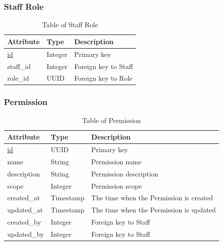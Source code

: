 \subsubsection{Staff Role}
\begin{table}[H]
    \centering
    \begin{tabular}{|p{3cm}|p{2cm}|p{\dimexpr\textwidth-6.8cm}|} %
        \hline
        \rowcolor[HTML]{C0C0C0} 
        \textbf{Attribute} & \textbf{Type} & \textbf{Description} \\ \hline
        \underline{id} & Integer & Primary key \\ \hline
        staff\_id & Integer & Foreign key to Staff \\ \hline
        role\_id & UUID & Foreign key to Role \\ \hline
    \end{tabular}
    \caption{Table of Staff Role}
    \label{tab:staff-role-table}
\end{table}

\subsubsection{Permission}
\begin{table}[H]
    \centering
    \begin{tabular}{|p{3cm}|p{2cm}|p{\dimexpr\textwidth-6.8cm}|} %
        \hline
        \rowcolor[HTML]{C0C0C0} 
        \textbf{Attribute} & \textbf{Type} & \textbf{Description} \\ \hline
        \underline{id} & UUID & Primary key \\ \hline
        name & String & Permission name \\ \hline
        description & String & Permission description \\ \hline
        scope & Integer & Permission scope \\ \hline
        created\_at & Timestamp & The time when the Permission is created \\ \hline
        updated\_at & Timestamp & The time when the Permission is updated \\ \hline
        created\_by & Integer & Foreign key to Staff \\ \hline
        updated\_by & Integer & Foreign key to Staff \\ \hline
    \end{tabular}
    \caption{Table of Permission}
    \label{tab:permission-table}
\end{table}

